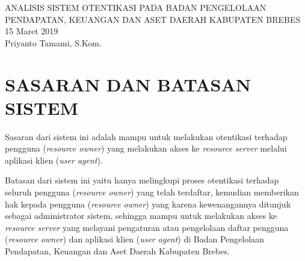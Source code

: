 \documentclass[pdftex,12pt, oneside]{article}
\begin{document}
\sloppy

%
\begin{center}
{\large ANALISIS SISTEM OTENTIKASI PADA BADAN PENGELOLAAN PENDAPATAN, KEUANGAN DAN ASET DAERAH KABUPATEN BREBES}
\\[1cm]
15 Maret 2019\\
Priyanto Tamami, S.Kom.
\end{center}


%
%

% 


%
%
%
%

%
%
%
% 
% 
% 

%
%


\section{SASARAN DAN BATASAN SISTEM}

Sasaran dari sistem ini adalah mampu untuk melakukan otentikasi terhadap pengguna (\textit{resource owner}) yang melakukan akses ke \textit{resource server} melalui aplikasi klien (\textit{user agent}).

Batasan dari sistem ini yaitu hanya melingkupi proses otentikasi terhadap seluruh pengguna (\textit{resource owner}) yang telah terdaftar, kemudian memberikan hak kepada pengguna (\textit{resource owner}) yang karena kewenangannya ditunjuk sebagai administrator sistem, sehingga mampu untuk melakukan akses ke \textit{resource server} yang melayani pengaturan atau pengelolaan daftar pengguna (\textit{resource owner}) dan aplikasi klien (\textit{user agent}) di Badan Pengelolaan Pendapatan, Keuangan dan Aset Daerah Kabupaten Brebes.
\end{document}
